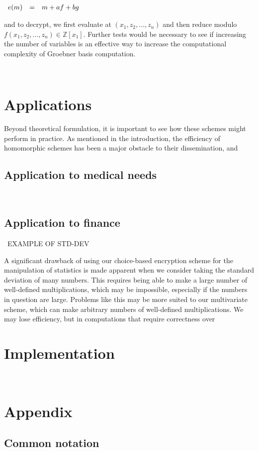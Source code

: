 \documentclass[11pt]{report}
\newcommand{\Z}{\mathbb{Z}}
\newcommand{\ba}{\\ \begin{array}{rcl}}
\newcommand{\ea}{\end{array} \\}
\begin{document}
$\ba
e(m) & = & m + af + bg
\ea$

and to decrypt, we first evaluate at $(x_1,z_2,\ldots,z_n)$ and then reduce modulo $f(x_1,z_2,\ldots,z_n) \in \Z[x_1]$. Further tests would be necessary to see if increasing the number of variables is an effective way to increase the computational complexity of Groebner basis computation. 

\


\chapter{Applications}

Beyond theoretical formulation, it is important to see how these schemes might perform in practice. As mentioned in the introduction, the efficiency of homomorphic schemes has been a major obstacle to their dissemination, and 

\section{Application to medical needs}

\

\section{Application to finance}

\ EXAMPLE OF STD-DEV

A significant drawback of using our choice-based encryption scheme for the manipulation of statistics is made apparent when we consider taking the standard deviation of many numbers. This requires being able to make a large number of well-defined multiplications, which may be impossible, especially if the numbers in question are large. Problems like this may be more suited to our multivariate scheme, which can make arbitrary numbers of well-defined multiplications. We may lose efficiency, but in computations that require correctness over

\chapter{Implementation}

\

\chapter{Appendix}

\section{Common notation}
\end{document}
